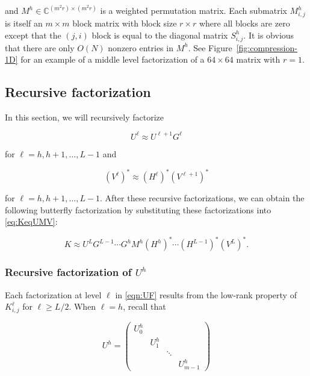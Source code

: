 and $M^h \in \mathbb{C}^{(m^2 r) \times (m^2 r)}$ is a weighted permutation matrix. Each submatrix $M^h_{i,j}$ is itself an $m\times m$ block matrix with block size $r\times r$ where all blocks are zero except that the $(j,i)$ block is equal to the diagonal matrix $S_{i,j}^h$. It is obvious that there are only $O(N)$ nonzero entries in $M^h$. See Figure~\ref{fig:compression-1D} for an example of a middle level factorization of a $64\times 64$ matrix with $r=1$.

\subsection{Recursive factorization}
\label{sec:RC}

In this section, we will recursively factorize

\begin{equation}
  \label{eqn:UF}
  U^\ell \approx U^{\ell+1}G^{\ell}
\end{equation}

for $\ell=h,h+1,\dots,L-1$ and

\begin{equation}
  \label{eqn:VF}
  (V^\ell)^* \approx (H^{\ell})^* (V^{\ell+1})^*
\end{equation}

for $\ell=h,h+1,\dots,L-1$.  After these recursive factorizations, we can obtain the following butterfly factorization by substituting these factorizations into \eqref{eq:KeqUMV}:

\begin{equation}
  K \approx U^{L}G^{L-1}\cdots G^{h} M^h (H^{h})^* \cdots (H^{L-1})^* (V^L)^*.
\end{equation}

\subsubsection{Recursive factorization of $U^h$}
\label{sec:RCU}

Each factorization at level $\ell$ in \eqref{eqn:UF} results from the low-rank property of $K^\ell_{i,j}$ for $\ell\geq L/2$.  When
$\ell=h$, recall that

\begin{equation*}
U^h=
\begin{pmatrix}
U^h_{0} & & &\\
 & U^h_{1} & &\\
 & & \ddots &\\
 & & & U^h_{m-1}
\end{pmatrix}
\end{equation*}

